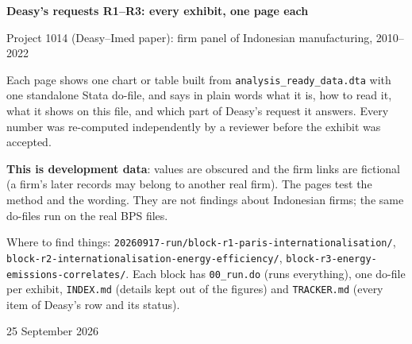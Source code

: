 \documentclass[10pt,a4paper]{article}
\begin{document}
\begin{titlepage}
\vspace*{3cm}
{\LARGE\bfseries Deasy's requests R1--R3: every exhibit, one page each}\par\vspace{10pt}
{\large Project 1014 (Deasy--Imed paper): firm panel of Indonesian manufacturing, 2010--2022}\par\vspace{24pt}
\begin{minipage}{0.85\linewidth}\small
Each page shows one chart or table built from \texttt{analysis\_ready\_data.dta} with one standalone Stata do-file, and says
in plain words what it is, how to read it, what it shows on this file, and which part of Deasy's request it answers.
Every number was re-computed independently by a reviewer before the exhibit was accepted.\par\medskip
\textbf{This is development data}: values are obscured and the firm links are fictional (a firm's later records may belong to
another real firm). The pages test the method and the wording. They are not findings about Indonesian firms; the same
do-files run on the real BPS files.\par\medskip
Where to find things: \texttt{20260917-run/block-r1-paris-internationalisation/}, \texttt{block-r2-internationalisation-energy-efficiency/},
\texttt{block-r3-energy-emissions-correlates/}. Each block has \texttt{00\_run.do} (runs everything), one do-file per exhibit,
\texttt{INDEX.md} (details kept out of the figures) and \texttt{TRACKER.md} (every item of Deasy's row and its status).
\end{minipage}
\vfill
{\small 25 September 2026}
\end{titlepage}
\setcounter{page}{2}


\clearpage
\tableofcontents
\clearpage




\end{document}
